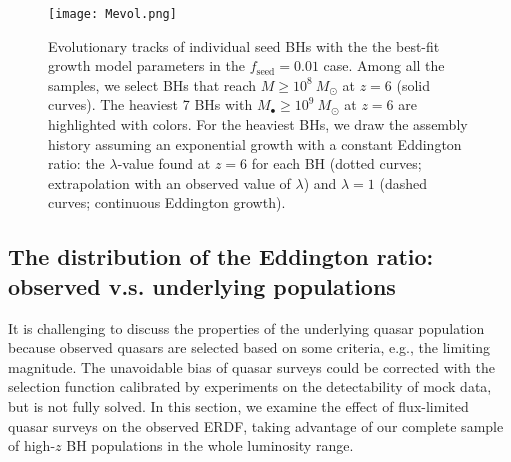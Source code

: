 \documentclass[twocolumn, twocolappendix]{aastex63}
\newcommand{\Msun}{M_\odot}
\newcommand{\fseed}{f_\mathrm{seed}}
\begin{document}
\begin{CJK*}{UTF8}{gbsn}
\begin{figure}
\centering
\texttt{[image: Mevol.png]}
\caption{
Evolutionary tracks of individual seed BHs with the the best-fit growth model parameters in the $\fseed=0.01$ case.
Among all the samples, we select BHs that reach $M\geq 10^8~\Msun$ at $z=6$ (solid curves). 
The heaviest 7 BHs with $M_\bullet \geq 10^9~\Msun$ at $z=6$ are highlighted with colors. 
For the heaviest BHs, we draw the assembly history assuming an exponential growth with a constant Eddington ratio: 
the $\lambda$-value found at $z=6$ for each BH (dotted curves; extrapolation with an observed value of $\lambda$) and 
$\lambda =1$ (dashed curves; continuous Eddington growth).
}
\label{fig:track}
\end{figure}



\vspace{2mm}
\subsection{The distribution of the Eddington ratio: \\observed v.s. underlying populations}\label{sec:ldist}

It is challenging to discuss the properties of the underlying quasar population
because observed quasars are selected based on some criteria, e.g., the limiting magnitude.
The unavoidable bias of quasar surveys could be corrected with the selection function calibrated
by experiments on the detectability of mock data, but is not fully solved. 
In this section, we examine the effect of flux-limited quasar surveys on the observed ERDF, 
taking advantage of our complete sample of high-$z$ BH populations in the whole luminosity range. 



\end{CJK*}
\end{document}
